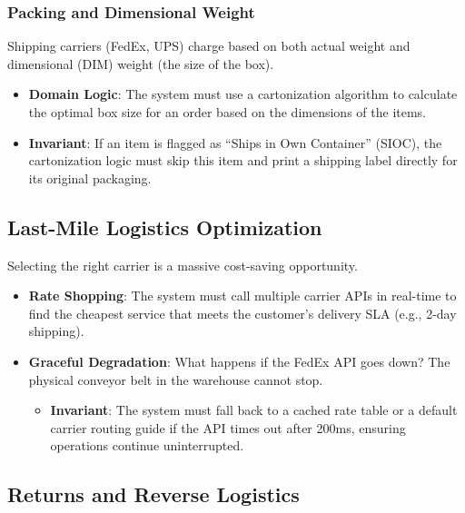 \documentclass[
  11pt,
  openany,
  oneside]{book}
\providecommand{\tightlist}{%
  \setlength{\itemsep}{0pt}\setlength{\parskip}{0pt}}
\begin{document}
\subsubsection{Packing and Dimensional
Weight}\label{packing-and-dimensional-weight}

Shipping carriers (FedEx, UPS) charge based on both actual weight and
dimensional (DIM) weight (the size of the box).

\begin{itemize}
\tightlist
\item
  \textbf{Domain Logic}: The system must use a cartonization algorithm
  to calculate the optimal box size for an order based on the dimensions
  of the items.
\item
  \textbf{Invariant}: If an item is flagged as ``Ships in Own
  Container'' (SIOC), the cartonization logic must skip this item and
  print a shipping label directly for its original packaging.
\end{itemize}

\subsection{Last-Mile Logistics
Optimization}\label{last-mile-logistics-optimization}

Selecting the right carrier is a massive cost-saving opportunity.

\begin{itemize}
\tightlist
\item
  \textbf{Rate Shopping}: The system must call multiple carrier APIs in
  real-time to find the cheapest service that meets the customer's
  delivery SLA (e.g., 2-day shipping).
\item
  \textbf{Graceful Degradation}: What happens if the FedEx API goes
  down? The physical conveyor belt in the warehouse cannot stop.

  \begin{itemize}
  \tightlist
  \item
    \textbf{Invariant}: The system must fall back to a cached rate table
    or a default carrier routing guide if the API times out after 200ms,
    ensuring operations continue uninterrupted.
  \end{itemize}
\end{itemize}

\subsection{Returns and Reverse
Logistics}\label{returns-and-reverse-logistics}
\end{document}
